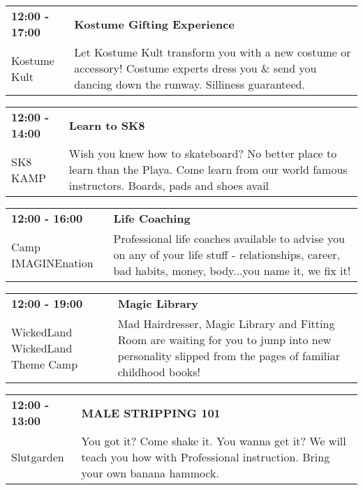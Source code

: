 \begin{tabular}{ p{1in} p{2.2in} }
    \textbf{12:00 - 17:00} & \textbf{Kostume Gifting Experience} \\
    Kostume Kult \newline  & Let Kostume Kult transform you with a new costume or accessory! Costume experts dress you \& send you dancing down the runway. Silliness guaranteed. \\
    \hline 
\end{tabular}
    
\begin{tabular}{ p{1in} p{2.2in} }
    \textbf{12:00 - 14:00} & \textbf{Learn to SK8} \\
    SK8 KAMP \newline  & Wish you knew how to skateboard? No better place to learn than the Playa. Come learn from our world famous instructors.  Boards, pads and shoes avail \\
    \hline 
\end{tabular}
    
\begin{tabular}{ p{1in} p{2.2in} }
    \textbf{12:00 - 16:00} & \textbf{Life Coaching} \\
    Camp IMAGINEnation \newline  & Professional life coaches available to advise you on any of your life stuff - relationships, career, bad habits, money, body...you name it, we fix it! \\
    \hline 
\end{tabular}
    
\begin{tabular}{ p{1in} p{2.2in} }
    \textbf{12:00 - 19:00} & \textbf{Magic Library} \\
    WickedLand \newline WickedLand Theme Camp & Mad Hairdresser, Magic Library and Fitting Room are waiting for you to jump into new personality slipped from the pages of familiar childhood books! \\
    \hline 
\end{tabular}
    
\begin{tabular}{ p{1in} p{2.2in} }
    \textbf{12:00 - 13:00} & \textbf{MALE STRIPPING 101} \\
    Slutgarden \newline  & You got it? Come shake it. You wanna get it? We will teach you how with Professional instruction. Bring your own banana hammock. \\
    \hline 
\end{tabular}
    
